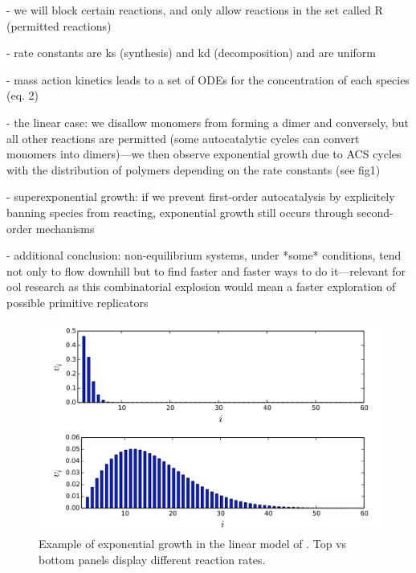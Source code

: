\documentclass[11pt]{article}
\begin{document}
\begin{markdown}
- we will block certain reactions, and only allow reactions in the set called R (permitted reactions)
    
- rate constants are ks (synthesis) and kd (decomposition) and are uniform
    
- mass action kinetics leads to a set of ODEs for the concentration of each species (eq. 2)
    
- the linear case: we disallow monomers from forming a dimer and conversely, but all other reactions are permitted (some autocatalytic cycles can convert monomers into dimers)—we then observe exponential growth due to ACS cycles with the distribution of polymers depending on the rate constants (see fig1)
    
- superexponential growth: if we prevent first-order autocatalysis by explicitely banning species from reacting, exponential growth still occurs through second-order mechanisms
    
- additional conclusion: non-equilibrium systems, under *some* conditions, tend not only to flow downhill but to find faster and faster ways to do it—relevant for ool research as this combinatorial explosion would mean a faster exploration of possible primitive replicators

\end{markdown}

\begin{figure}[hbt]
  \includegraphics[width=\textwidth]{figures/virgo2016/fig1.png}
  \caption{Example of exponential growth in the linear model of \cite{virgo_complex_2016}. Top vs bottom panels display different reaction rates.}
  \label{fig:virgo2016fig1}
\end{figure}
\end{document}
